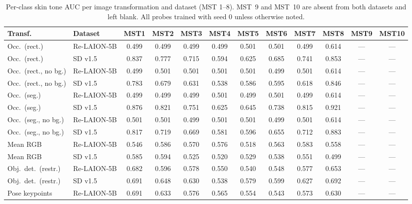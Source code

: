 \begin{table}[htbp]
	\centering
	\caption{Per-class skin tone AUC per image transformation and dataset
		(MST 1--8). MST~9 and MST~10 are absent from both datasets and left blank.
		All probes trained with seed 0 unless otherwise noted.}
	\label{tab:skintone_separability_perclass}
	\small
	\begin{tabular}{llcccccccccc}
		\toprule
		\textbf{Transf.} & \textbf{Dataset} &
		\textbf{MST1} & \textbf{MST2} & \textbf{MST3} & \textbf{MST4} &
		\textbf{MST5} & \textbf{MST6} & \textbf{MST7} & \textbf{MST8} &
		\textbf{MST9} & \textbf{MST10} \\
		\midrule
		Occ.\ (rect.)         & Re-LAION-5B & 0.499 & 0.499 & 0.499 & 0.499 & 0.501 & 0.501 & 0.499 & 0.614 & --- & --- \\
		Occ.\ (rect.)         & SD v1.5     & 0.837 & 0.777 & 0.715 & 0.594 & 0.625 & 0.685 & 0.741 & 0.853 & --- & --- \\
		Occ.\ (rect., no bg.) & Re-LAION-5B & 0.499 & 0.501 & 0.501 & 0.501 & 0.501 & 0.499 & 0.501 & 0.614 & --- & --- \\
		Occ.\ (rect., no bg.) & SD v1.5     & 0.783 & 0.679 & 0.631 & 0.538 & 0.586 & 0.595 & 0.618 & 0.846 & --- & --- \\
		Occ.\ (seg.)          & Re-LAION-5B & 0.499 & 0.499 & 0.499 & 0.501 & 0.499 & 0.501 & 0.499 & 0.614 & --- & --- \\
		Occ.\ (seg.)          & SD v1.5     & 0.876 & 0.821 & 0.751 & 0.625 & 0.645 & 0.738 & 0.815 & 0.921 & --- & --- \\
		Occ.\ (seg., no bg.)  & Re-LAION-5B & 0.501 & 0.501 & 0.499 & 0.501 & 0.501 & 0.499 & 0.501 & 0.614 & --- & --- \\
		Occ.\ (seg., no bg.)  & SD v1.5     & 0.817 & 0.719 & 0.669 & 0.581 & 0.596 & 0.655 & 0.712 & 0.883 & --- & --- \\
		Mean RGB              & Re-LAION-5B & 0.546 & 0.586 & 0.570 & 0.576 & 0.518 & 0.563 & 0.583 & 0.558 & --- & --- \\
		Mean RGB              & SD v1.5     & 0.585 & 0.594 & 0.525 & 0.520 & 0.529 & 0.538 & 0.551 & 0.499 & --- & --- \\
		Obj.\ det.\ (restr.)  & Re-LAION-5B & 0.682 & 0.596 & 0.578 & 0.550 & 0.540 & 0.548 & 0.577 & 0.653 & --- & --- \\
		Obj.\ det.\ (restr.)  & SD v1.5     & 0.691 & 0.648 & 0.630 & 0.538 & 0.579 & 0.599 & 0.627 & 0.692 & --- & --- \\
		Pose keypoints        & Re-LAION-5B & 0.691 & 0.633 & 0.576 & 0.565 & 0.554 & 0.543 & 0.573 & 0.630 & --- & --- \\

\end{tabular}
\end{table}
